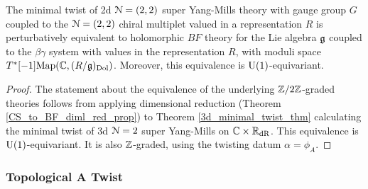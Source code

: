 \documentclass[10pt, oneside]{article}
\begin{document}
\begin{theorem} \label{2d_minimal_twist_thm}
The minimal twist of 2d $\mathcal N=(2,2)$ super Yang-Mills theory with gauge group $G$ coupled to the $\mathcal N=(2,2)$ chiral multiplet valued in a representation $R$ is perturbatively equivalent to holomorphic $BF$ theory for the Lie algebra $\mathfrak g$ coupled to the $\beta\gamma$ system with values in the representation $R$, with moduli space $T^*[-1]\mathrm{Map}(\mathbb C, (R/\mathfrak{g})_{\mathrm{Dol}})$.  Moreover, this equivalence is $\mathrm{U}(1)$-equivariant.
\end{theorem}

\begin{proof}
The statement about the equivalence of the underlying $\mathbb Z/2\mathbb Z$-graded theories follows from applying dimensional reduction (Theorem \ref{CS_to_BF_diml_red_prop}) to Theorem \ref{3d_minimal_twist_thm} calculating the minimal twist of 3d $\mathcal{N}=2$ super Yang-Mills on $\mathbb C \times \mathbb R_{\mathrm{dR}}$.  This equivalence is $\mathrm{U}(1)$-equivariant.  It is also $\mathbb Z$-graded, using the twisting datum $\alpha = \phi_A$.
\end{proof}

\subsubsection{Topological A Twist} \label{sect:2d22Atwist}
\end{document}
